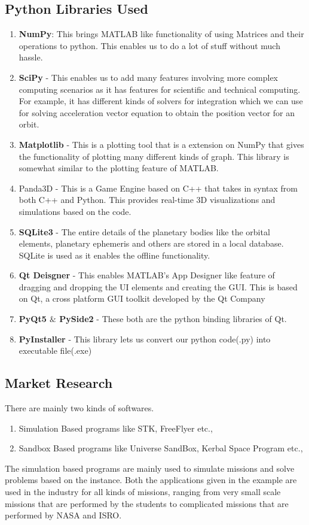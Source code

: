 \documentclass[12pt]{article}
\begin{document}
\subsection{Python Libraries Used}
\begin{enumerate}
\item \textbf{NumPy}:  This brings MATLAB like functionality of using Matrices and their operations to python. This enables us to do a lot of stuff without much hassle.
\item \textbf{SciPy} - This enables us to add many features involving more complex computing scenarios as it has features for scientific and technical computing. For example, it has different kinds of solvers for integration which we can use for solving acceleration vector equation to obtain the position vector for an orbit.
\item \textbf{Matplotlib} - This is a plotting tool that is a extension on NumPy that gives the functionality of plotting many different kinds of graph. This library is somewhat similar to the plotting feature of MATLAB.
\item Panda3D - This is a Game Engine based on C++ that takes in syntax from both C++ and Python. This provides real-time 3D visualizations and simulations based on the code.
\item \textbf{SQLite3} - The entire details of the planetary bodies like the orbital elements, planetary ephemeris and others are stored in a local database. SQLite is used as it enables the offline functionality.
\item \textbf{Qt Deisgner} - This enables MATLAB's App Designer like feature of dragging and dropping the UI elements and creating the GUI. This is based on Qt, a cross platform GUI toolkit developed by the Qt Company
\item \textbf{PyQt5 $\&$ PySide2} - These both are the python binding libraries of Qt.
\item \textbf{PyInstaller} - This library lets us convert our python code(.py) into executable file(.exe)


\end{enumerate}
\subsection{Market Research}
There are mainly two kinds of softwares.
\begin{enumerate}
\item Simulation Based programs like STK, FreeFlyer etc.,
\item Sandbox Based programs like Universe SandBox, Kerbal Space Program etc.,
\end{enumerate}
\hspace{4em}The simulation based programs are mainly used to simulate missions and solve problems based on the instance. Both the applications given in the example are used in the industry for all kinds of missions, ranging from very small scale missions that are performed by the students to complicated missions that are performed by NASA and ISRO.
\end{document}
